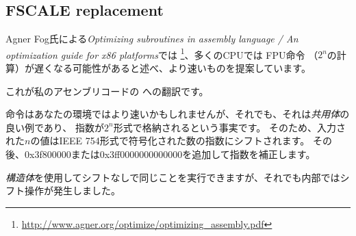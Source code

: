 ﻿\subsection{FSCALE replacement}

Agner Fog氏による\emph{Optimizing subroutines in assembly language / An optimization guide for x86 platforms}では
\footnote{\url{http://www.agner.org/optimize/optimizing_assembly.pdf}}、多くのCPUでは \ac{FPU}命令
（$2^n$の計算）が遅くなる可能性があると述べ、より速いものを提案しています。

これが私のアセンブリコードの \CCpp への翻訳です。



命令はあなたの環境ではより速いかもしれませんが、それでも、それは\emph{共用体}の良い例であり、
指数が$2^n$形式で格納されるという事実です。
そのため、入力された$n$の値はIEEE 754形式で符号化された数の指数にシフトされます。
その後、0x3f800000または0x3ff0000000000000を追加して指数を補正します。

\emph{構造体}を使用してシフトなしで同じことを実行できますが、それでも内部ではシフト操作が発生しました。
